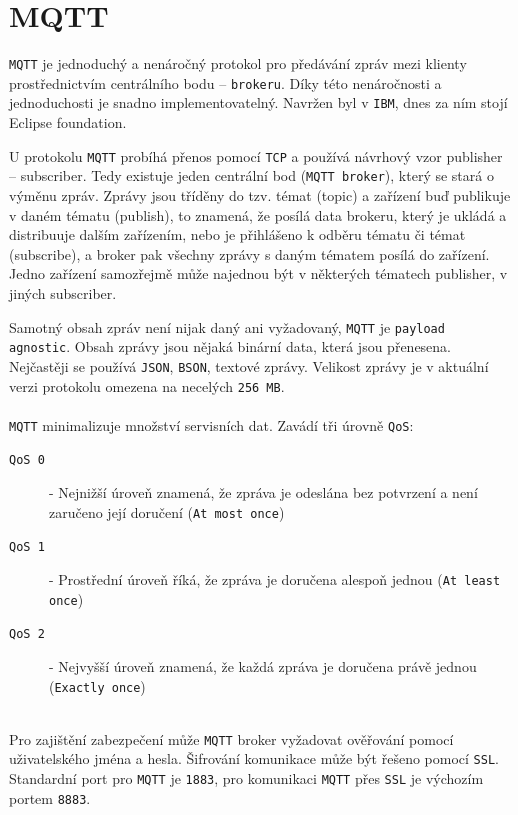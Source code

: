 \documentclass[czech,BP]{thesiskiv}
\begin{document}
		\section{MQTT}
\texttt{MQTT} je jednoduchý a nenáročný protokol pro předávání zpráv mezi klienty prostřednictvím centrálního bodu – \texttt{brokeru}. Díky této nenáročnosti a jednoduchosti je snadno implementovatelný. Navržen byl v \texttt{IBM}, dnes za ním stojí Eclipse foundation.\cite{maly2016mqtt}

U protokolu \texttt{MQTT} probíhá přenos pomocí \texttt{TCP} a používá návrhový vzor publisher – subscriber. Tedy existuje jeden centrální bod (\texttt{MQTT broker}), který se stará o výměnu zpráv. Zprávy jsou tříděny do tzv. témat (topic) a zařízení buď publikuje v daném tématu (publish), to znamená, že posílá data brokeru, který je ukládá a distribuuje dalším zařízením, nebo je přihlášeno k odběru tématu či témat (subscribe), a broker pak všechny zprávy s daným tématem posílá do zařízení. Jedno zařízení samozřejmě může najednou být v některých tématech publisher, v jiných subscriber.\cite{maly2016mqtt}

Samotný obsah zpráv není nijak daný ani vyžadovaný, \texttt{MQTT} je \texttt{payload agnostic}. Obsah zprávy jsou nějaká binární data, která jsou přenesena. Nejčastěji se používá \texttt{JSON}, \texttt{BSON}, textové zprávy. Velikost zprávy je v aktuální verzi protokolu omezena na necelých \texttt{256 MB}.\cite{maly2016mqtt}
\\\\		
\texttt{MQTT} minimalizuje množství servisních dat. Zavádí tři úrovně \texttt{QoS}:
\begin{description}
\item [\texttt{QoS 0}] - Nejnižší úroveň znamená, že zpráva je odeslána bez potvrzení a není zaručeno její doručení (\texttt{At most once})
\item [\texttt{QoS 1}] - Prostřední úroveň říká, že zpráva je doručena alespoň jednou (\texttt{At least once})
\item [\texttt{QoS 2}] - Nejvyšší úroveň znamená, že každá zpráva je doručena právě jednou (\texttt{Exactly once})
\end{description}
\ \\
Pro zajištění zabezpečení může \texttt{MQTT} broker vyžadovat ověřování pomocí uživatelského jména a hesla. Šifrování komunikace může být řešeno pomocí \texttt{SSL}. 
Standardní port pro \texttt{MQTT} je \texttt{1883}, pro komunikaci \texttt{MQTT} přes \texttt{SSL} je výchozím portem \texttt{8883}.\cite{karagiannis2015survey}
	
\end{document}
